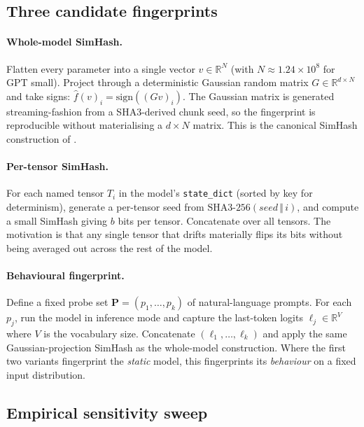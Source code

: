 \documentclass[11pt,a4paper]{article}
\begin{document}
\subsection{Three candidate fingerprints}
\label{sec:model:candidates}

\paragraph{Whole\nobreakdash-model SimHash.}  Flatten every parameter into
a single vector $v \in \mathbb{R}^N$ (with $N \approx 1.24 \times
10^{8}$ for GPT small).  Project through a deterministic
Gaussian random matrix $G \in \mathbb{R}^{d \times N}$ and take
signs: $\hat{f}(v)_i = \mathrm{sign}((Gv)_i)$.  The Gaussian matrix
is generated streaming\nobreakdash-fashion from a SHA3\nobreakdash-derived
chunk seed, so the fingerprint is reproducible without
materialising a $d \times N$ matrix.  This is the canonical
SimHash construction of \cite{charikar2002simhash}.

\paragraph{Per\nobreakdash-tensor SimHash.}  For each named tensor
$T_i$ in the model's \texttt{state\_dict} (sorted by key for
determinism), generate a per\nobreakdash-tensor seed from $\mathrm{SHA3\text{-}256}(\mathit{seed}
\,\Vert\, i)$, and compute a small SimHash giving
$b$ bits per tensor.  Concatenate over all tensors.  The motivation
is that any single tensor that drifts materially flips its bits
without being averaged out across the rest of the model.

\paragraph{Behavioural fingerprint.}  Define a fixed probe set
$\mathbf{P} = (p_1, \ldots, p_k)$ of natural\nobreakdash-language
prompts.  For each $p_j$, run the model in inference mode and
capture the last\nobreakdash-token logits
$\ell_j \in \mathbb{R}^V$ where $V$ is the vocabulary size.
Concatenate $(\ell_1, \ldots, \ell_k)$ and apply the same
Gaussian\nobreakdash-projection SimHash as the whole\nobreakdash-model
construction.  Where the first two variants fingerprint the
\emph{static} model, this fingerprints its \emph{behaviour}
on a fixed input distribution.

\subsection{Empirical sensitivity sweep}
\label{sec:model:sweep}
\end{document}
